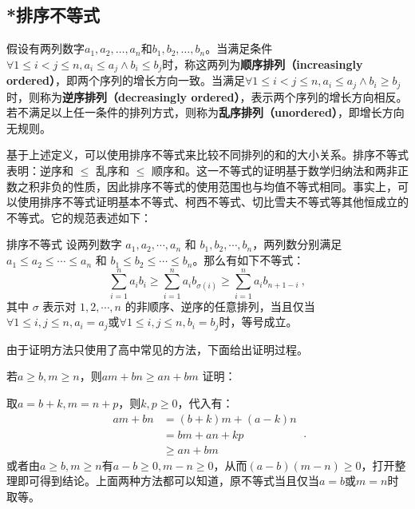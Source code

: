 \subsection{*排序不等式}

假设有两列数字$a_1, a_2, \dots, a_n$和$b_1, b_2, \dots, b_n$。当满足条件$\forall 1 \leq i < j \leq n,  a_i \leq a_j \land b_i \leq b_j$时，称这两列为\textbf{顺序排列（increasingly ordered）}，即两个序列的增长方向一致。当满足$\forall 1 \leq i < j \leq n,  a_i \leq a_j \land b_i \geq b_j$时，则称为\textbf{逆序排列（decreasingly ordered）}，表示两个序列的增长方向相反。若不满足以上任一条件的排列方式，则称为\textbf{乱序排列（unordered）}，即增长方向无规则。

基于上述定义，可以使用排序不等式来比较不同排列的和的大小关系。排序不等式表明：逆序和 $\leq$ 乱序和 $\leq$ 顺序和。这一不等式的证明基于数学归纳法和两非正数之积非负的性质，因此排序不等式的使用范围也与均值不等式相同。事实上，可以使用排序不等式证明基本不等式、柯西不等式、切比雪夫不等式等其他恒成立的不等式。它的规范表述如下：

\begin{theorem}{排序不等式}
设两列数字 $a_1, a_2, \cdots, a_n$ 和 $b_1, b_2, \cdots, b_n$，两列数分别满足 $a_1 \leq a_2 \leq \cdots \leq a_n$ 和 $b_1 \leq b_2 \leq \cdots \leq b_n$。那么有如下不等式：
\begin{equation}
\sum_{i=1}^n a_i b_i \geq \sum_{i=1}^n a_i b_{\sigma(i)} \geq \sum_{i=1}^n a_i b_{n+1-i}~,
\end{equation}
其中 $\sigma$ 表示对 ${1, 2, \cdots, n}$ 的非顺序、逆序的任意排列，当且仅当$\forall 1\leq i,j\leq n,a_i=a_j$或$\forall 1\leq i,j\leq n,b_i=b_j$时，等号成立。
\end{theorem}

由于证明方法只使用了高中常见的方法，下面给出证明过程。

\begin{lemma}{若$a\geq b,m\geq n$，则$am+bn\geq an+bm$}\label{lem_HsEquN_1}
证明：

取$a=b+k,m=n+p$，则$k,p\geq0$，代入有：
\begin{equation}
\begin{split}
am+bn&= (b+k)m+(a-k)n \\ 
&= bm+an+kp \\
&\geq an+bm
\end{split}~.
\end{equation}
或者由$a\geq b,m\geq n$有$a-b\geq 0,m- n\geq0$，从而$(a-b)(m- n)\geq0$，打开整理即可得到结论。上面两种方法都可以知道，原不等式当且仅当$a=b$或$m=n$时取等。
\end{lemma}

